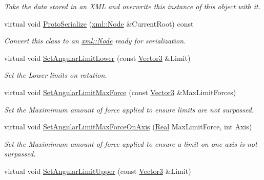 \begin{DoxyCompactItemize}
\begin{DoxyCompactList}\small\item\em Take the data stored in an XML and overwrite this instance of this object with it. \item\end{DoxyCompactList}\item 
virtual void \hyperlink{classphys_1_1Generic6DofConstraint_a9cf4eb82a625d06116542f6d224cdd69}{ProtoSerialize} (\hyperlink{classphys_1_1xml_1_1Node}{xml::Node} \&CurrentRoot) const 
\begin{DoxyCompactList}\small\item\em Convert this class to an \hyperlink{classphys_1_1xml_1_1Node}{xml::Node} ready for serialization. \item\end{DoxyCompactList}\item 
virtual void \hyperlink{classphys_1_1Generic6DofConstraint_a625d093366185366a56a632a88955435}{SetAngularLimitLower} (const \hyperlink{classphys_1_1Vector3}{Vector3} \&Limit)
\begin{DoxyCompactList}\small\item\em Set the Lower limits on rotation. \item\end{DoxyCompactList}\item 
virtual void \hyperlink{classphys_1_1Generic6DofConstraint_a3d7be2f7db602ddce8e090a1f987be2e}{SetAngularLimitMaxForce} (const \hyperlink{classphys_1_1Vector3}{Vector3} \&MaxLimitForces)
\begin{DoxyCompactList}\small\item\em Set the Maximimum amount of force applied to ensure limits are not surpassed. \item\end{DoxyCompactList}\item 
virtual void \hyperlink{classphys_1_1Generic6DofConstraint_a3d06296ebcbeb32965e350499dcc9120}{SetAngularLimitMaxForceOnAxis} (\hyperlink{namespacephys_af7eb897198d265b8e868f45240230d5f}{Real} MaxLimitForce, int Axis)
\begin{DoxyCompactList}\small\item\em Set the Maximimum amount of force applied to ensure a limit on one axis is not surpassed. \item\end{DoxyCompactList}\item 
virtual void \hyperlink{classphys_1_1Generic6DofConstraint_ad1995d5c76e54895a51ef26ab9b03e3c}{SetAngularLimitUpper} (const \hyperlink{classphys_1_1Vector3}{Vector3} \&Limit)

\end{DoxyCompactItemize}
